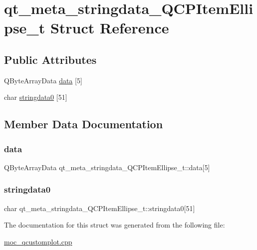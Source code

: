 \hypertarget{structqt__meta__stringdata__QCPItemEllipse__t}{}\section{qt\+\_\+meta\+\_\+stringdata\+\_\+\+Q\+C\+P\+Item\+Ellipse\+\_\+t Struct Reference}
\label{structqt__meta__stringdata__QCPItemEllipse__t}
\subsection*{Public Attributes}
\begin{DoxyCompactItemize}
\item 
Q\+Byte\+Array\+Data \mbox{\hyperlink{structqt__meta__stringdata__QCPItemEllipse__t_ac8506617981990ea7d33afbc41f97fd2}{data}} \mbox{[}5\mbox{]}
\item 
char \mbox{\hyperlink{structqt__meta__stringdata__QCPItemEllipse__t_a47fd49f50069acd98fc8a4f2dec3672a}{stringdata0}} \mbox{[}51\mbox{]}
\end{DoxyCompactItemize}


\subsection{Member Data Documentation}
\mbox{\label{structqt__meta__stringdata__QCPItemEllipse__t_ac8506617981990ea7d33afbc41f97fd2}} 
\subsubsection{\texorpdfstring{data}{data}}
{\footnotesize\ttfamily Q\+Byte\+Array\+Data qt\+\_\+meta\+\_\+stringdata\+\_\+\+Q\+C\+P\+Item\+Ellipse\+\_\+t\+::data\mbox{[}5\mbox{]}}

\mbox{\label{structqt__meta__stringdata__QCPItemEllipse__t_a47fd49f50069acd98fc8a4f2dec3672a}} 
\subsubsection{\texorpdfstring{stringdata0}{stringdata0}}
{\footnotesize\ttfamily char qt\+\_\+meta\+\_\+stringdata\+\_\+\+Q\+C\+P\+Item\+Ellipse\+\_\+t\+::stringdata0\mbox{[}51\mbox{]}}



The documentation for this struct was generated from the following file\+:\begin{DoxyCompactItemize}
\item 
\mbox{\hyperlink{moc__qcustomplot_8cpp}{moc\+\_\+qcustomplot.\+cpp}}\end{DoxyCompactItemize}
